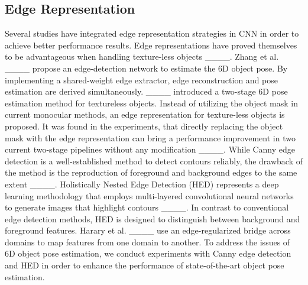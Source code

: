 \subsection{Edge Representation}
Several studies have integrated edge representation strategies in CNN in order to achieve better performance results. 
Edge representations have proved themselves to be advantageous when handling texture-less objects ____.
Zhang et al. ____ propose an edge-detection network to estimate the 6D object pose. By implementing a shared-weight edge extractor, edge reconstruction and pose estimation are derived simultaneously.
____ introduced a two-stage 6D pose estimation method for textureless objects.
Instead of utilizing the object mask in current monocular methods, an edge representation for texture-less objects is proposed.
It was found in the experiments, that directly replacing the object mask with the edge representation can bring a performance improvement in two current two-stage pipelines without any modification ____.
While Canny edge detection is a well-established method to detect contours reliably, the drawback of the method is the reproduction of foreground and background edges to the same extent ____.
Holistically Nested Edge Detection (HED) represents a deep learning methodology that employs multi-layered convolutional neural networks to generate images that highlight contours ____.
In contrast to conventional edge detection methods, HED is designed to distinguish between background and foreground features. 
Harary et al. ____ use an edge-regularized bridge across domains to map features from one domain to another. 
To address the issues of 6D object pose estimation, we conduct experiments with Canny edge detection and HED in order to enhance the performance of state-of-the-art object pose estimation.